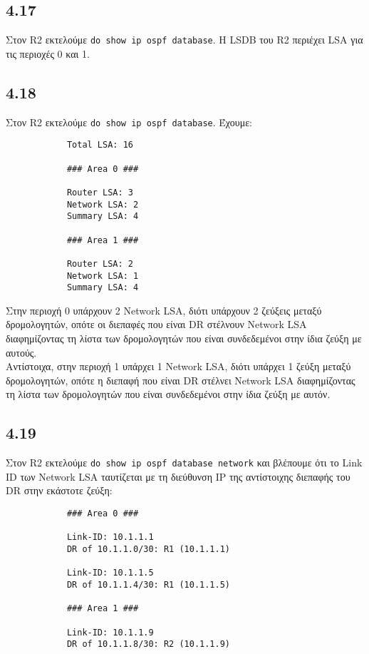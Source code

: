 \documentclass[a4paper, 12pt]{article}
\begin{document}
	\subsection*{4.17}
		Στον R2 εκτελούμε \verb|do show ip ospf database|. Η LSDB του R2 περιέχει LSA για τις περιοχές 0 και 1.

	\subsection*{4.18}
		Στον R2 εκτελούμε \verb|do show ip ospf database|. Έχουμε:
				
		\begin{verbatim}
			Total LSA: 16
			
			### Area 0 ###
			
			Router LSA: 3
			Network LSA: 2
			Summary LSA: 4
			
			### Area 1 ###
			
			Router LSA: 2
			Network LSA: 1
			Summary LSA: 4
		\end{verbatim}
		
		Στην περιοχή 0 υπάρχουν 2 Network LSA, διότι υπάρχουν 2 ζεύξεις μεταξύ δρομολογητών, οπότε οι διεπαφές που είναι DR στέλνουν Network LSA διαφημίζοντας τη λίστα των δρομολογητών που είναι συνδεδεμένοι στην ίδια ζεύξη με αυτούς. \\
		
		Αντίστοιχα, στην περιοχή 1 υπάρχει 1 Network LSA, διότι υπάρχει 1 ζεύξη μεταξύ δρομολογητών, οπότε η διεπαφή που είναι DR στέλνει Network LSA διαφημίζοντας τη λίστα των δρομολογητών που είναι συνδεδεμένοι στην ίδια ζεύξη με αυτόν.

	\subsection*{4.19}
		Στον R2 εκτελούμε \verb|do show ip ospf database network| και βλέπουμε ότι το Link ID των Network LSA ταυτίζεται με τη διεύθυνση IP της αντίστοιχης διεπαφής του DR στην εκάστοτε ζεύξη:
		
		\begin{verbatim}
			### Area 0 ###
			
			Link-ID: 10.1.1.1 
			DR of 10.1.1.0/30: R1 (10.1.1.1)
			
			Link-ID: 10.1.1.5 
			DR of 10.1.1.4/30: R1 (10.1.1.5)  
			
			### Area 1 ###
			
			Link-ID: 10.1.1.9 
			DR of 10.1.1.8/30: R2 (10.1.1.9) 
		\end{verbatim}
\end{document}

